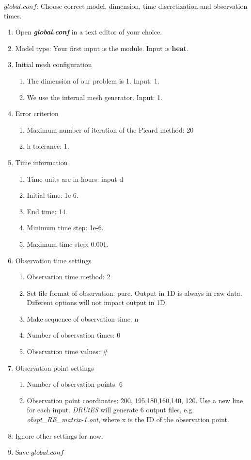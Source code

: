 \documentclass[
10pt, %
a4paper, %
oneside, %
headinclude,footinclude, %
BCOR5mm, %
]{scrartcl}
\begin{document}
$global.conf$: Choose correct model, dimension, time discretization and observation times.
\begin{enumerate}
\item Open \textbf{\emph{global.conf}} in a text editor of your choice. 
\item Model type: Your first input is the module. Input is \textbf{heat}.
\item Initial mesh configuration \begin{enumerate}
\item The dimension of our problem is 1. Input: 1.
\item We use the internal mesh generator. Input: 1. 
\end{enumerate}
\item Error criterion \begin{enumerate} 
\item Maximum number of iteration of the Picard method: 20 
\item h tolerance: 1.
\end{enumerate}
\item Time information 
\begin{enumerate} 
\item Time units are in hours: input d
\item Initial time: 1e-6.
\item End time: 14.
\item Minimum time step: 1e-6.
\item Maximum time step: 0.001.
\end{enumerate}
\item Observation time settings \begin{enumerate}
\item Observation time method: 2
\item Set file format of observation: pure. Output in 1D is always in raw data. Different options will not impact output in 1D.
\item Make sequence of observation time: n
\item Number of observation times: 0
\item Observation time values: \#
\end{enumerate}
\item Observation point settings \begin{enumerate}
\item Number of observation points: 6 
\item Observation point coordinates: 200, 195,180,160,140, 120. Use a new line for each input. \textit{DRUtES} will generate 6 output files, e.g. \textit{obspt\_RE\_matrix-1.out}, where x is the ID of the observation point. 
\end{enumerate}
\item Ignore other settings for now. 
\item Save $global.conf$
\end{enumerate}
\end{document}
